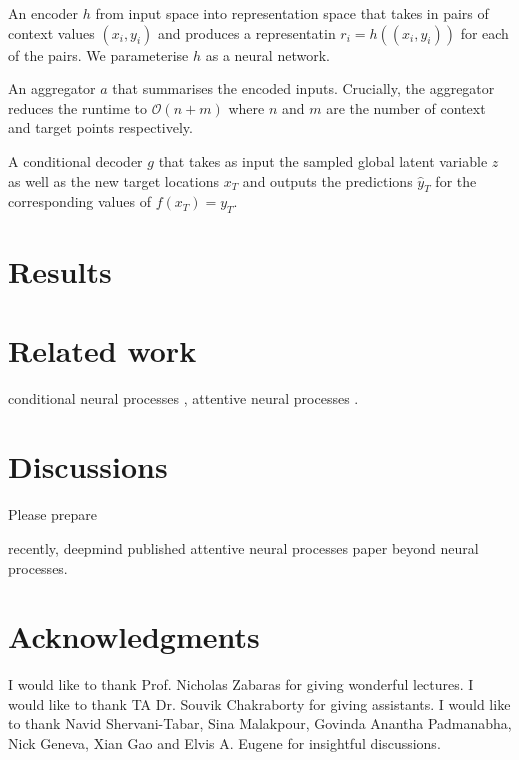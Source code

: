\documentclass{article}
\begin{document}
An encoder $h$ from input space into representation space that takes in pairs of context values $(x_{i}, y_{i})$ and produces a representatin $r_{i} = h((x_{i}, y_{i}))$ for each of the pairs. We parameterise $h$ as a neural network.

An aggregator $a$ that summarises the encoded inputs. 
Crucially, the aggregator reduces the runtime to $\mathcal{O}(n+m)$ where $n$ and $m$ are the number of context and target points respectively.

A conditional decoder $g$ that takes as input the sampled global latent variable $z$ as well as the new target locations $x_{T}$ and outputs the predictions $\hat{y}_{T}$ for the corresponding values of $f(x_{T}) = y_{T}$.

\section{Results}
\label{results}



\section{Related work}
\label{relatedwork}


conditional neural processes \cite{garnelo2018conditional}, attentive neural processes \cite{kim2019attentive}.

\section{Discussions}
\label{discussions}

Please prepare 

recently, deepmind published attentive neural processes paper beyond neural processes.


\section*{Acknowledgments}
I would like to thank Prof. Nicholas Zabaras for giving wonderful lectures. I would like to thank TA Dr. Souvik Chakraborty for giving assistants. I would like to thank 
Navid Shervani-Tabar, Sina Malakpour, 
Govinda Anantha Padmanabha, Nick Geneva, Xian Gao and Elvis A. Eugene for insightful discussions. 



\let\bibhang\relax

\end{document}

